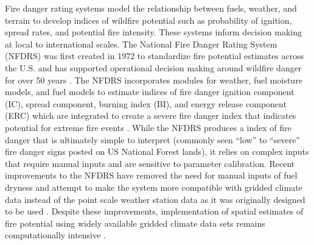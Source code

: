 \documentclass[11p]{article}
\begin{document}
Fire danger rating systems model the relationship between fuels, weather, and terrain to develop indices of wildfire potential such as probability of ignition, spread rates, and potential fire intensity. These systems inform decision making at local to international scales. The National Fire Danger Rating System (NFDRS) was first created in 1972 to standardize fire potential estimates across the U.S. and has supported operational decision making around wildfire danger for over 50 years \citep{jollyModernizingUSNational2024,zacharakisEnvironmentalForestFire2023}. The NFDRS incorporates modules for weather, fuel moisture models, and fuel models to estimate indices of fire danger ignition component (IC), spread component, burning index (BI), and energy release component (ERC) which are integrated to create a severe fire danger index that indicates potential for extreme fire events \citep{jollyModernizingUSNational2024,jollySevereFireDanger2019}. While the NFDRS produces a index of fire danger that is ultimately simple to interpret (commonly seen ``low'' to ``severe'' fire danger signs posted on US National Forest lands), it relies on complex inputs that require manual inputs and are sensitive to parameter calibration. Recent improvements to the NFDRS have removed the need for manual inputs of fuel dryness and attempt to make the system more compatible with gridded climate data instead of the point scale weather station data as it was originally designed to be used \citep{jollyModernizingUSNational2024}. Despite these improvements, implementation of spatial estimates of fire potential using widely available gridded climate data sets remains computationally intensive \citep{farguellFastSpatialNFDRS2025a}.

\end{document}
